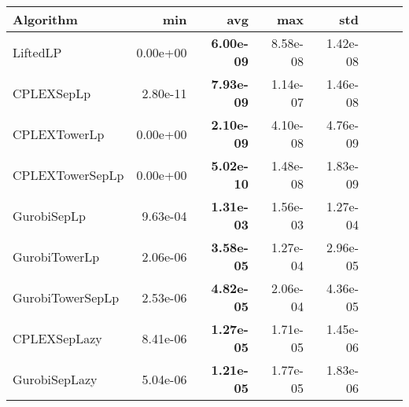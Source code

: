 \begin{tabular}{lrrrrrrr}
Algorithm & min & avg & max & std
\\
\hline
LiftedLP&0.00e+00& \bf6.00e-09& 8.58e-08& 1.42e-08\\
CPLEXSepLp&2.80e-11& \bf7.93e-09& 1.14e-07& 1.46e-08\\
CPLEXTowerLp&0.00e+00& \bf2.10e-09& 4.10e-08& 4.76e-09\\
CPLEXTowerSepLp&0.00e+00& \bf5.02e-10& 1.48e-08& 1.83e-09\\
GurobiSepLp&9.63e-04& \bf1.31e-03& 1.56e-03& 1.27e-04\\
GurobiTowerLp&2.06e-06& \bf3.58e-05& 1.27e-04& 2.96e-05\\
GurobiTowerSepLp&2.53e-06& \bf4.82e-05& 2.06e-04& 4.36e-05\\
CPLEXSepLazy&8.41e-06& \bf1.27e-05& 1.71e-05& 1.45e-06\\
GurobiSepLazy&5.04e-06& \bf1.21e-05& 1.77e-05& 1.83e-06
\end{tabular}
